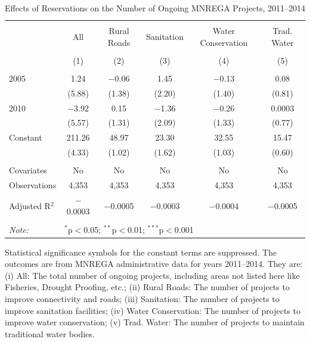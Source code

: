 \begin{table}[!htbp]
\centering
\begin{threeparttable}

  \caption{Effects of Reservations on the Number of Ongoing MNREGA Projects, 2011--2014} 
  \label{main_mnrega_ongoing} 
\scriptsize 
\begin{tabular}{@{\extracolsep{0pt}}lccccc} 
\\[-1.8ex]\hline 
\hline \\[-1.8ex] 
 & All & Rural Roads & Sanitation & Water Conservation & Trad. Water \\ 
\\[-1.8ex] & (1) & (2) & (3) & (4) & (5)\\ 
\hline \\[-1.8ex] 
 2005 & 1.24 & $-$0.06 & 1.45 & $-$0.13 & 0.08 \\ 
  & (5.88) & (1.38) & (2.20) & (1.40) & (0.81) \\ 
  2010 & $-$3.92 & 0.15 & $-$1.36 & $-$0.26 & 0.0003 \\ 
  & (5.57) & (1.31) & (2.09) & (1.33) & (0.77) \\ 
  Constant & 211.26 & 48.97 & 23.30 & 32.55 & 15.47 \\ 
  & (4.33) & (1.02) & (1.62) & (1.03) & (0.60) \\ 
 \hline \\[-1.8ex] 
Covariates & No & No & No & No & No \\ 
Observations & 4,353 & 4,353 & 4,353 & 4,353 & 4,353 \\ 
Adjusted R$^{2}$ & $-$0.0003 & $-$0.0005 & $-$0.0003 & $-$0.0004 & $-$0.0005 \\ 
\hline 
\hline \\[-1.8ex] 
\textit{Note:}  & \multicolumn{5}{l}{$^{*}$p$<$0.05; $^{**}$p$<$0.01; $^{***}$p$<$0.001} \\ 
\end{tabular} 
\begin{tablenotes}[flushleft]
\scriptsize
\item[] Statistical significance symbols for the constant terms are suppressed. The outcomes are from MNREGA administrative data for years 2011--2014. They are: 
                     (i) All: The total number of ongoing projects, including areas not listed here like Fisheries, Drought Proofing, etc.;
                     (ii) Rural Roads: The number of projects to improve connectivity and roads;
                     (iii) Sanitation: The number of projects to improve sanitation facilities;
                     (iv) Water Conservation: The number of projects to improve water conservation;
                     (v) Trad. Water: The number of projects to maintain traditional water bodies.
\end{tablenotes}
\end{threeparttable}
\end{table}
